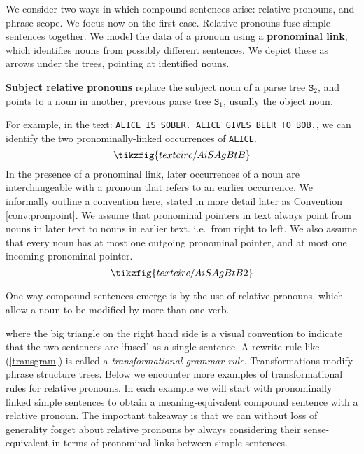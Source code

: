  We consider two ways in which compound sentences arise: relative pronouns, and phrase scope. We focus now on the first case. Relative pronouns fuse simple sentences together. We model the data of a pronoun using a \textbf{pronominal link}, which identifies nouns from possibly different sentences. We depict these as arrows under the trees, pointing at identified nouns.

\begin{marginfigure}
\centering
{}
\caption{\textbf{Subject relative pronouns} replace the subject noun of a parse tree $\texttt{S}_2$, and points to a noun in another, previous parse tree $\texttt{S}_1$, usually the object noun.}
\end{marginfigure}

\begin{example}
For example, in the text: \texttt{\underline{ALICE IS SOBER.} \underline{ALICE GIVES BEER TO BOB.}}, we can identify the two pronominally-linked occurrences of \texttt{\underline{ALICE}}.
\[\tikzfig{textcirc/AiSAgBtB}\]
In the presence of a pronominal link, later occurrences of a noun are interchangeable with a pronoun that refers to an earlier occurrence. We informally outline a convention here, stated in more detail later as Convention \ref{conv:pronpoint}. We assume that pronominal pointers in text always point from nouns in later text to nouns in earlier text. i.e.~from right to left. We also assume that every noun has at most one outgoing pronominal pointer, and at most one incoming pronominal pointer.
\[\tikzfig{textcirc/AiSAgBtB2}\]
\end{example}

One way compound sentences emerge is by the use of relative pronouns, which allow a noun to be modified by more than one verb. 

where the big triangle on the right hand side is a visual convention to indicate that the two sentences are `fused' as a single sentence. A rewrite rule like (\ref{transgram}) is called a \emph{transformational grammar rule}. Transformations modify phrase structure trees. Below we encounter more examples of transformational rules for relative pronouns. In each example we will start with pronominally linked simple sentences to obtain a meaning-equivalent compound sentence with a relative pronoun. The important takeaway is that we can without loss of generality forget about relative pronouns by always considering their sense-equivalent in terms of pronominal links between simple sentences.

